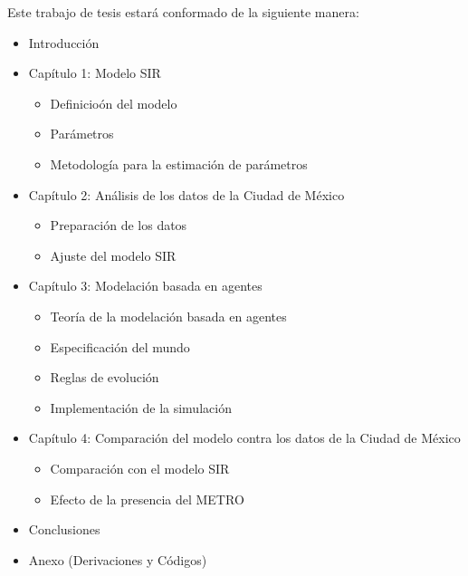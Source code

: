 \documentclass[a4paper,openany,12pt]{article}
\begin{document}
\newpage

Este trabajo de tesis estará conformado de la siguiente manera:
\begin{itemize}
\item Introducción
\item Capítulo 1: Modelo SIR
	\begin{itemize}
		\item {Definicioón del modelo}
		\item {Parámetros}
		\item {Metodología para la estimación de parámetros}
	\end{itemize}
\item Capítulo 2: Análisis de los datos de la Ciudad de México
	\begin{itemize}
		\item {Preparación de los datos}
		\item {Ajuste del modelo SIR}
	\end{itemize}
\item Capítulo 3: Modelación basada en agentes
	\begin{itemize}
		\item {Teoría de la modelación basada en agentes}
		\item {Especificación del mundo}
		\item {Reglas de evolución}
		\item {Implementación de la simulación}
	\end{itemize}
\item Capítulo 4: Comparación del modelo contra los datos de la Ciudad de México
	\begin{itemize}
		\item {Comparación con el modelo SIR}
		\item {Efecto de la presencia del METRO}
	\end{itemize}
\item Conclusiones
\item Anexo (Derivaciones y Códigos)
\end{itemize}
\end{document}
